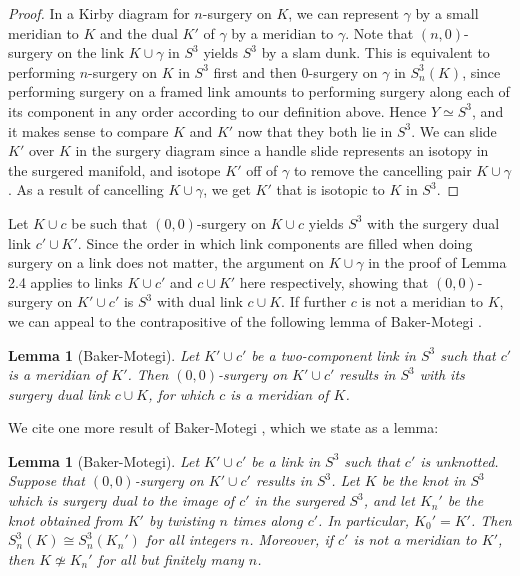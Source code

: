 \documentclass[11pt,usenames,dvipsnames,reqno]{amsart}
\numberwithin{theorem}{section}
\newtheorem{lemma}[theorem]{Lemma}
\theoremstyle{ex}
\theoremstyle{rem}
\begin{document}
\begin{proof}
	In a Kirby diagram for $n$-surgery on $K$, we can represent $\gamma$ by a small meridian to $K$ and the dual $K'$ of $\gamma$ by a meridian to $\gamma$. Note that $(n, 0)$-surgery on the link $K \cup \gamma$ in $S^3$ yields $S^3$ by a slam dunk. This is equivalent to performing $n$-surgery on $K$ in $S^3$ first and then $0$-surgery on $\gamma$ in $S^3_n(K)$, since performing surgery on a framed link amounts to performing surgery along each of its component in any order according to our definition above. Hence $Y \simeq S^3$, and it makes sense to compare $K$ and $K'$ now that they both lie in $S^3$. We can slide $K'$ over $K$ in the surgery diagram since a handle slide represents an isotopy in the surgered manifold, and isotope $K'$ off of $\gamma$ to remove the cancelling pair $K\cup \gamma$. As a result of cancelling $K\cup \gamma$, we get $K'$ that is isotopic to $K$ in $S^3$. 
\end{proof}

Let $K \cup c$ be such that $(0, 0)$-surgery on $K \cup c$ yields $S^3$ with the surgery dual link $c' \cup K'$. Since the order in which link components are filled when doing surgery on a link does not matter, the argument on $K\cup \gamma$ in the proof of Lemma 2.4 applies to links $K\cup c'$ and $c\cup K'$ here respectively, showing that $(0,0)$-surgery on $K'\cup c'$ is $S^3$ with dual link $c\cup K$. If further $c$ is not a meridian to $K$, we can appeal to the contrapositive of the following lemma of Baker-Motegi \cite[Lemma 2.4]{baker-motegi}. 

\begin{lemma}[Baker-Motegi]
	Let $K'\cup c'$ be a two-component link in $S^3$ such that $c'$ is a meridian of $K'$. Then $(0,0)$-surgery on $K'\cup c'$ results in $S^3$ with its surgery dual link $c\cup K$, for which $c$ is a meridian of $K$.
\end{lemma}
	
We cite one more result of Baker-Motegi \cite[Theorem 2.1]{baker-motegi}, which we state as a lemma:

\begin{lemma}[Baker-Motegi]
	Let $K'\cup c'$ be a link in $S^3$ such that $c'$ is unknotted. Suppose that $(0,0)$-surgery on $K'\cup c'$ results in $S^3$. Let $K$ be the knot in $S^3$ which is surgery dual to the image of $c'$ in the surgered $S^3$, and let $K_n'$ be the knot obtained from $K'$ by twisting $n$ times along $c'$. In particular, $K_0'=K'$. Then $S^3_n(K)\cong S^3_n(K_n')$ for all integers $n$. Moreover, if $c'$ is not a meridian to $K'$, then $K\not\simeq K_n'$ for all but finitely many $n$.
\end{lemma}
\end{document}
